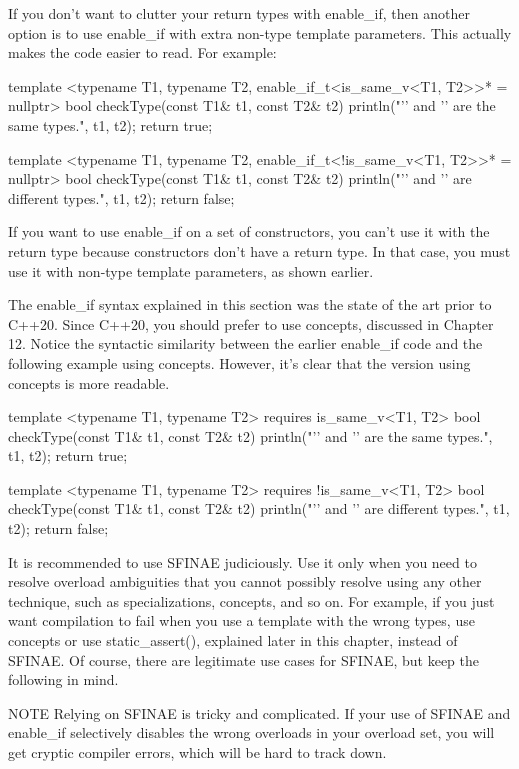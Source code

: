 If you don’t want to clutter your return types with enable\_if, then another option is to use enable\_if with extra non-type template parameters. This actually makes the code easier to read. For example:

\begin{cpp}
template <typename T1, typename T2, enable_if_t<is_same_v<T1, T2>>* = nullptr>
bool checkType(const T1& t1, const T2& t2)
{
    println("'{}' and '{}' are the same types.", t1, t2);
    return true;
}

template <typename T1, typename T2, enable_if_t<!is_same_v<T1, T2>>* = nullptr>
bool checkType(const T1& t1, const T2& t2)
{
    println("'{}' and '{}' are different types.", t1, t2);
    return false;
}
\end{cpp}

If you want to use enable\_if on a set of constructors, you can’t use it with the return type because constructors don’t have a return type. In that case, you must use it with non-type template parameters, as shown earlier.

The enable\_if syntax explained in this section was the state of the art prior to C++20. Since C++20, you should prefer to use concepts, discussed in Chapter 12. Notice the syntactic similarity between the earlier enable\_if code and the following example using concepts. However, it’s clear that the version using concepts is more readable.

\begin{cpp}
template <typename T1, typename T2> requires is_same_v<T1, T2>
bool checkType(const T1& t1, const T2& t2)
{
    println("'{}' and '{}' are the same types.", t1, t2);
    return true;
}

template <typename T1, typename T2> requires !is_same_v<T1, T2>
bool checkType(const T1& t1, const T2& t2)
{
    println("'{}' and '{}' are different types.", t1, t2);
    return false;
}
\end{cpp}

It is recommended to use SFINAE judiciously. Use it only when you need to resolve overload ambiguities that you cannot possibly resolve using any other technique, such as specializations, concepts, and so on. For example, if you just want compilation to fail when you use a template with the wrong types, use concepts or use static\_assert(), explained later in this chapter, instead of SFINAE. Of course, there are legitimate use cases for SFINAE, but keep the following in mind.

\begin{myNotic}{NOTE}
Relying on SFINAE is tricky and complicated. If your use of SFINAE and enable\_if selectively disables the wrong overloads in your overload set, you will get cryptic compiler errors, which will be hard to track down.
\end{myNotic}

